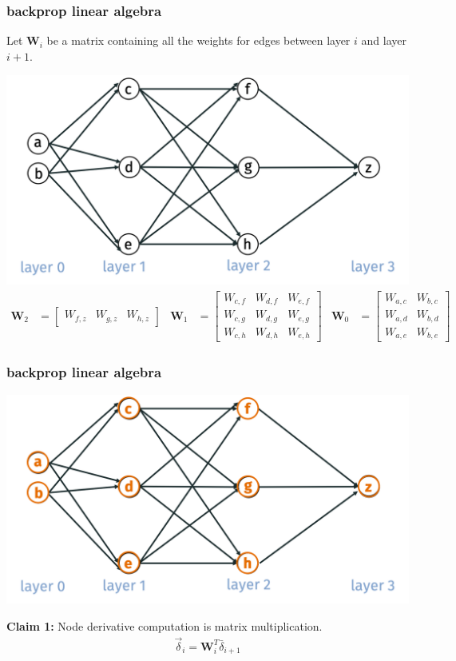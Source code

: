 \documentclass[handout,compress]{beamer}
\newcommand{\bv}[1]{\mathbf{#1}}
\begin{document}
	\begin{frame}
		\frametitle{backprop linear algebra}
		\small
		
		Let $\bv{W}_i$ be a matrix containing all the weights for edges between layer $i$ and layer $i+1$. 
		
		\includegraphics[width=.5\textwidth]{no_select.png}
		\begin{align*}
		\bv{W}_2 &= \begin{bmatrix}W_{f,z}&W_{g,z}& W_{h,z}\end{bmatrix} & \bv{W}_1 &= \begin{bmatrix}W_{c,f}&W_{d,f}& W_{e,f}\\
		W_{c,g}&W_{d,g}& W_{e,g}\\
		W_{c,h}&W_{d,h}& W_{e,h}
		\end{bmatrix}
		& \bv{W}_0 &= \begin{bmatrix}W_{a,c}&W_{b,c}\\
		W_{a,d}&W_{b,d}\\
		W_{a,e}&W_{b,e}
		\end{bmatrix}
		\end{align*}
	\end{frame}
	
	\begin{frame}
		\frametitle{backprop linear algebra}
		\small
		
		\includegraphics[width=.5\textwidth]{all_nodes.png}
		
		\textbf{Claim 1:} Node derivative computation is matrix multiplication.
		\begin{align*}
		\vec{\delta}_i = \bv{W}_i^T \bar{\delta}_{i+1}
		\end{align*}
	\end{frame}
	
\end{document}
